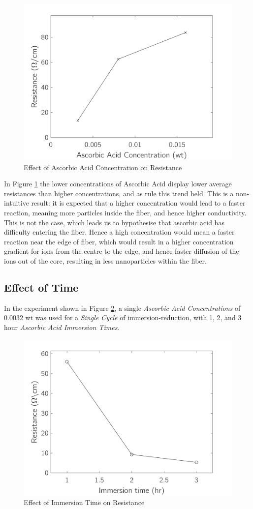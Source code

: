 \documentclass[a4paper, oneside]{discothesis}
\begin{document}
\begin{figure}[ht]
    \centering
    \includegraphics[width=.6\textwidth, keepaspectratio]{figures/single_resistance_concentration.png}
    \caption{Effect of Ascorbic Acid Concentration on Resistance}
    \label{single_resistance_conc}
\end{figure}
In Figure \ref{single_resistance_conc} the lower concentrations of Ascorbic Acid display lower average resistances than higher concentrations, and as rule this trend held. This is a non-intuitive result: it is expected that a higher concentration would lead to a faster reaction, meaning more  particles inside the fiber, and hence higher conductivity. 
\\This is not the case, which leads us to hypothesise that ascorbic acid has difficulty entering the fiber. Hence a high concentration would mean a faster reaction near the edge of fiber, which would result in a higher concentration gradient for  ions from the centre to the edge, and hence faster diffusion of the  ions out of the core, resulting in less  nanoparticles within the fiber.

\subsection{Effect of Time}
In the experiment shown in Figure \ref{single_resistance_time}, a single \textit{Ascorbic Acid Concentrations} of 0.0032 wt was used for a \textit{Single Cycle} of immersion-reduction, with  1, 2, and 3 hour \textit{Ascorbic Acid Immersion Times}. 

\begin{figure}[ht]
    \centering
    \includegraphics[width=.6\textwidth, keepaspectratio]{figures/single_resistance_time.png}
    \caption{Effect of Immersion Time on Resistance}
    \label{single_resistance_time}
\end{figure}
\end{document}
